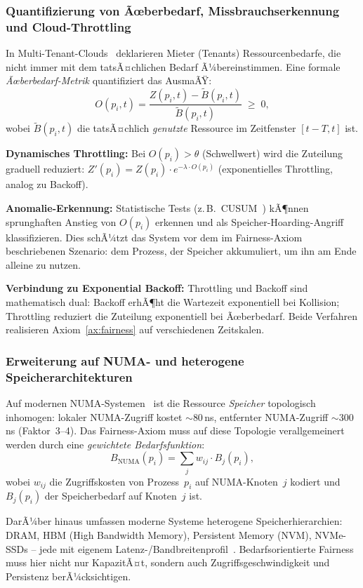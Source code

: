﻿\documentclass[a4paper,12pt]{article}
\theoremstyle{definition}
\begin{document}
\subsubsection{Quantifizierung von Ãœberbedarf, Missbrauchs\-erkennung
und Cloud-Throttling}

In Multi-Tenant-Clouds~\cite{armbrust2010view} deklarieren
Mieter (Tenants) Ressourcenbedarfe, die nicht immer mit dem
tatsÃ¤chlichen Bedarf Ã¼bereinstimmen. Eine formale
\emph{Ãœberbedarf-Metrik} quantifiziert das AusmaÃŸ:
\[
  O(p_i, t) = \frac{Z(p_i, t) - \tilde{B}(p_i, t)}
                   {\tilde{B}(p_i, t)} \;\geq\; 0,
\]
wobei $\tilde{B}(p_i, t)$ die tatsÃ¤chlich \emph{genutzte}
Ressource im Zeitfenster $[t-T, t]$ ist.

\textbf{Dynamisches Throttling:} Bei $O(p_i) > \theta$
(Schwellwert) wird die Zuteilung graduell reduziert:
$Z'(p_i) = Z(p_i) \cdot e^{-\lambda \cdot O(p_i)}$
(exponentielles Throttling, analog zu Backoff).

\textbf{Anomalie-Erkennung:} Statistische Tests (z.\,B.\
CUSUM~\cite{page1954continuous}) kÃ¶nnen sprunghaften Anstieg
von $O(p_i)$ erkennen und als Speicher-Hoarding-Angriff
klassifizieren. Dies schÃ¼tzt das System vor dem im
Fairness-Axiom beschriebenen Szenario: dem Prozess, der
Speicher akkumuliert, um ihn am Ende alleine zu nutzen.

\textbf{Verbindung zu Exponential Backoff:} Throttling und
Backoff sind mathematisch dual: Backoff erhÃ¶ht die Wartezeit
exponentiell bei Kollision; Throttling reduziert die Zuteilung
exponentiell bei Ãœberbedarf. Beide Verfahren realisieren
Axiom~\ref{ax:fairness} auf verschiedenen Zeitskalen.

\subsubsection{Erweiterung auf NUMA- und heterogene Speicher\-architekturen}

Auf modernen NUMA-Systemen~\cite{lameter2013numa} ist die
Ressource \emph{Speicher} topologisch inhomogen:
lokaler NUMA-Zugriff kostet $\sim 80$\,ns, entfernter
NUMA-Zugriff $\sim 300$\,ns (Faktor~3--4).
Das Fairness-Axiom muss auf diese Topologie verallgemeinert
werden durch eine \emph{gewichtete Bedarfsfunktion}:
\[
  B_{\mathrm{NUMA}}(p_i) = \sum_{j} w_{ij} \cdot B_j(p_i),
\]
wobei $w_{ij}$ die Zugriffskosten von Prozess~$p_i$ auf
NUMA-Knoten~$j$ kodiert und $B_j(p_i)$ der Speicherbedarf
auf Knoten~$j$ ist.

DarÃ¼ber hinaus umfassen moderne Systeme heterogene
Speicherhierarchien: DRAM, HBM (High Bandwidth Memory),
Persistent Memory (NVM), NVMe-SSDs -- jede mit eigenem
Latenz-/Bandbreitenprofil~\cite{izraelevitz2019basic}.
Bedarfsorientierte Fairness muss hier nicht nur KapazitÃ¤t,
sondern auch Zugriffsgeschwindigkeit und Persistenz
berÃ¼cksichtigen.
\end{document}
